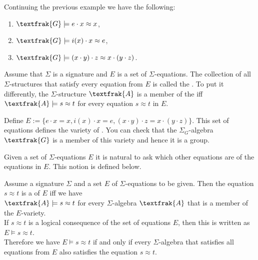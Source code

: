 \example
Continuing the previous example we have the following:
\begin{enumerate}
\item $\textfrak{G} \models e \cdot x \approx x$,
\item $\textfrak{G} \models i(x) \cdot x \approx e$,
\item $\textfrak{G} \models (x \cdot y) \cdot z \approx x \cdot (y \cdot z)$. \eoxs
\end{enumerate}

\begin{Definition}[$E$-Variety]
  Assume that $\Sigma$ is a signature and $E$ is a set of $\Sigma$-equations.  The collection of all
  $\Sigma$-structures that satisfy every equation from $E$ is called the .  To put it differently,
  the $\Sigma$-structure $\textfrak{A}$ is a member of the  iff
  \\[0.2cm]
  \hspace*{1.3cm}
  $\textfrak{A} \models s \approx t$ \quad for every equation $s \approx t$ in $E$. \eoxs
\end{Definition}

\example
Define $E := \bigl\{ e \cdot x = x, i(x) \cdot x = e, (x \cdot y) \cdot z = x \cdot (y \cdot z) \bigr\}$.
This set of equations defines the variety of .  You can check that the $\Sigma_G$-algebra
$\textfrak{G}$ is a member of this variety and hence it is a group.  
\eoxs

Given a set of $\Sigma$-equations $E$ it is natural to ask which other equations are  of
the equations in $E$.  This notion is defined below. 

\begin{Definition}
  Assume a signature $\Sigma$ and a set $E$ of $\Sigma$-equations to be given.
  Then the equation $s \approx t$ is a  of $E$ iff we have
  \\[0.2cm]
  \hspace*{1.3cm}
  $\textfrak{A} \models s \approx t$ \quad for every $\Sigma$-algebra $\textfrak{A}$ that is a member of the $E$-variety.
  \\[0.2cm]
  If $s \approx t$ is a logical consequence of the set of equations $E$, then this is written as
  \\[0.2cm]
  \hspace*{1.3cm}
  $E \models s \approx t$.
  \\[0.2cm]
  Therefore we have $E \models s \approx t$ if and only if every $\Sigma$-algebra that satisfies all equations
  from $E$ also satisfies the equation $s \approx t$. \eoxs
\end{Definition}

